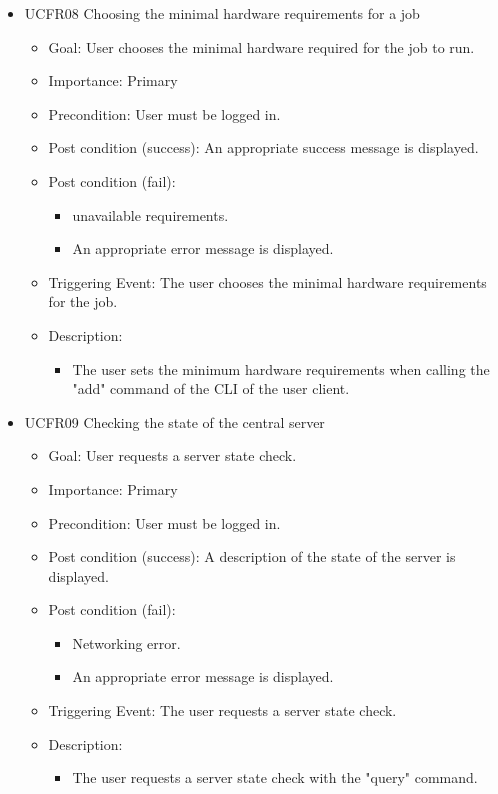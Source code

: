\begin{itemize}
    \item  UCFR08 Choosing the minimal hardware requirements for a job
    \begin{itemize}
      \item Goal: User chooses the minimal hardware required for the job to run.
      \item Importance: Primary
      \item Precondition: User must be logged in.
      \item Post condition (success): An appropriate success message is displayed.
      \item Post condition (fail):
      \begin{itemize}
        \item unavailable requirements.
        \item An appropriate error message is displayed.
      \end{itemize}
      \item Triggering Event: The user chooses the minimal hardware requirements for the job.
      \item Description:
      \begin{itemize}
        \item The user sets the minimum hardware requirements when calling the "add" command of the CLI of the user client.
      \end{itemize}
    \end{itemize}

    \item  UCFR09 Checking the state of the central server
    \begin{itemize}
      \item Goal: User requests a server state check.
      \item Importance: Primary
      \item Precondition: User must be logged in.
      \item Post condition (success): A description of the state of the server is displayed.
      \item Post condition (fail):
      \begin{itemize}
        \item Networking error.
        \item An appropriate error message is displayed.
      \end{itemize}
      \item Triggering Event: The user requests a server state check.
      \item Description:
      \begin{itemize}
        \item The user requests a server state check with the "query" command.
      \end{itemize}
    \end{itemize}



\end{itemize}
